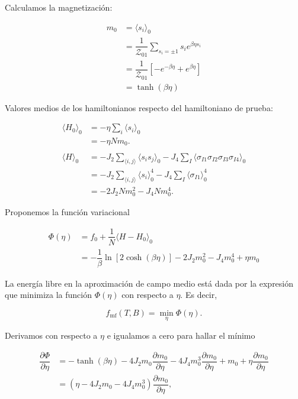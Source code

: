 \documentclass[10pt]{article}
\begin{document}
Calculamos la magnetizaci\'on:

\begin{align} \label{eq:BC_m0}
m_0 &= \langle s_i \rangle_0 \nonumber \\
&= \dfrac{1}{\mathcal{Z}_{01}} \sum_{s_i=\pm1} s_i e^{\beta \eta s_i} \nonumber \\
&= \dfrac{1}{\mathcal{Z}_{01}} \left[-e^{-\beta \eta} + e^{\beta \eta} \right] \nonumber \\
&= \tanh\left( \beta \eta \right)
\end{align}


Valores medios de los hamiltonianos respecto del hamiltoniano de prueba:

\begin{align}
\langle H_0 \rangle_0 &= -\eta \sum_i \langle s_i \rangle_0  \nonumber \\
&= -\eta N m_0. \\
\nonumber \\
\langle H \rangle_0 &= -J_2 \sum_{\langle i,j\rangle} \langle s_i s_j \rangle_0 - J_4 \sum_I \langle\sigma_{I1}\sigma_{I2}\sigma_{I3}\sigma_{I4} \rangle_0 \nonumber \\
&= -J_2 \sum_{\langle i,j\rangle} \langle s_i\rangle_0^4 - J_4 \sum_I \langle\sigma_{I1}\rangle_0^4  \nonumber \\
&= -2 J_2 N m_0^2 - J_4 N m_0^4 .
\end{align}

Proponemos la funci\'on variacional 

\begin{align} \label{eq:BC_Phi}
\Phi(\eta) &= f_0 + \dfrac{1}{N} \langle H - H_0 \rangle_0 \nonumber \\
&= -\dfrac{1}{\beta} \ln \left[2 \cosh\left(\beta \eta\right) \right] -2 J_2 m_0^2 - J_4 m_0^4 + \eta m_0
\end{align}

La energ\'ia libre en la aproximaci\'on de campo medio est\'a dada por la expresi\'on que minimiza la funci\'on $\Phi(\eta)$ con respecto a $\eta$. Es decir,

\begin{equation}
f_{\mathrm{mf}}(T,B) = \min_{\eta} \Phi(\eta).
\end{equation}

Derivamos con respecto a $\eta$ e igualamos a cero para hallar el m\'inimo

\begin{align}
\dfrac{\partial \Phi}{\partial \eta} &= - \tanh\left(\beta \eta\right) - 4 J_2 m_0 \dfrac{\partial m_0}{\partial \eta} - 4 J_4 m_0^3 \dfrac{\partial m_0}{\partial \eta} + m_0 + \eta \dfrac{\partial m_0}{\partial \eta} \nonumber \\
&= \left(\eta - 4 J_2 m_0 - 4 J_4 m_0^3\right) \dfrac{\partial m_0}{\partial \eta},
\end{align}
\end{document}
